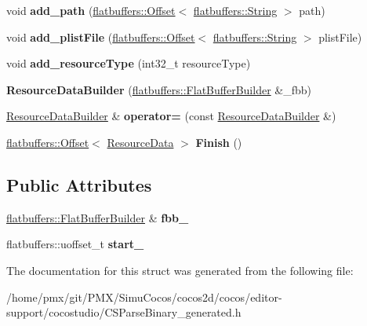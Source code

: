 \begin{DoxyCompactItemize}
void {\bfseries add\+\_\+path} (\hyperlink{structflatbuffers_1_1Offset}{flatbuffers\+::\+Offset}$<$ \hyperlink{structflatbuffers_1_1String}{flatbuffers\+::\+String} $>$ path)
\item 
\mbox{\label{structflatbuffers_1_1ResourceDataBuilder_ac79afcc06a6af3f7a23144b6e132ceca}} 
void {\bfseries add\+\_\+plist\+File} (\hyperlink{structflatbuffers_1_1Offset}{flatbuffers\+::\+Offset}$<$ \hyperlink{structflatbuffers_1_1String}{flatbuffers\+::\+String} $>$ plist\+File)
\item 
\mbox{\label{structflatbuffers_1_1ResourceDataBuilder_a5c1dc799b28837a21813f1e6d170ff32}} 
void {\bfseries add\+\_\+resource\+Type} (int32\+\_\+t resource\+Type)
\item 
\mbox{\label{structflatbuffers_1_1ResourceDataBuilder_a94273c9b65068c3de515d7a3b19d611d}} 
{\bfseries Resource\+Data\+Builder} (\hyperlink{classflatbuffers_1_1FlatBufferBuilder}{flatbuffers\+::\+Flat\+Buffer\+Builder} \&\+\_\+fbb)
\item 
\mbox{\label{structflatbuffers_1_1ResourceDataBuilder_aae9fe63762ff9dbfdf843ea5a9179ce1}} 
\hyperlink{structflatbuffers_1_1ResourceDataBuilder}{Resource\+Data\+Builder} \& {\bfseries operator=} (const \hyperlink{structflatbuffers_1_1ResourceDataBuilder}{Resource\+Data\+Builder} \&)
\item 
\mbox{\label{structflatbuffers_1_1ResourceDataBuilder_a7d31d467bc1f7eb637ccf7db99727c1b}} 
\hyperlink{structflatbuffers_1_1Offset}{flatbuffers\+::\+Offset}$<$ \hyperlink{structflatbuffers_1_1ResourceData}{Resource\+Data} $>$ {\bfseries Finish} ()
\end{DoxyCompactItemize}
\subsection*{Public Attributes}
\begin{DoxyCompactItemize}
\item 
\mbox{\label{structflatbuffers_1_1ResourceDataBuilder_ad55beede55a7e9aba94f01981111b9ff}} 
\hyperlink{classflatbuffers_1_1FlatBufferBuilder}{flatbuffers\+::\+Flat\+Buffer\+Builder} \& {\bfseries fbb\+\_\+}
\item 
\mbox{\label{structflatbuffers_1_1ResourceDataBuilder_ac28600e23a4bc88f4f918c47b082d4aa}} 
flatbuffers\+::uoffset\+\_\+t {\bfseries start\+\_\+}
\end{DoxyCompactItemize}


The documentation for this struct was generated from the following file\+:\begin{DoxyCompactItemize}
\item 
/home/pmx/git/\+P\+M\+X/\+Simu\+Cocos/cocos2d/cocos/editor-\/support/cocostudio/C\+S\+Parse\+Binary\+\_\+generated.\+h\end{DoxyCompactItemize}
